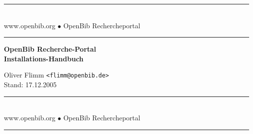 \documentclass[11pt, twoside, a4paper, BCOR8mm, DIV12, bibtotoc,idxtotoc]{scrbook}
\begin{document}
\frontmatter

\begin{titlepage}

\begin{center}
\rule[-.1in]{16cm}{1mm}\\[3mm]
{\fontsize{20}{20pt}\selectfont
  www.openbib.org $\bullet$ OpenBib Rechercheportal}\\[-2mm]
\rule[-.1in]{16cm}{1mm}

\vspace{5cm}

  \textbf{\fontsize{30}{30pt}\selectfont OpenBib Recherche-Portal\\[3mm] Installations-Handbuch}

  \vspace{2cm}

  Oliver Flimm \texttt{<flimm@openbib.de>}\\
  Stand: 17.12.2005

  \vspace{8cm}

\rule[-.1in]{16cm}{1mm}\\[3mm]
{\fontsize{20}{20pt}\selectfont
  www.openbib.org $\bullet$ OpenBib Rechercheportal}\\[-2mm]
\rule[-.1in]{16cm}{1mm}

\end{center}

\end{titlepage}






\tableofcontents
\end{document}
